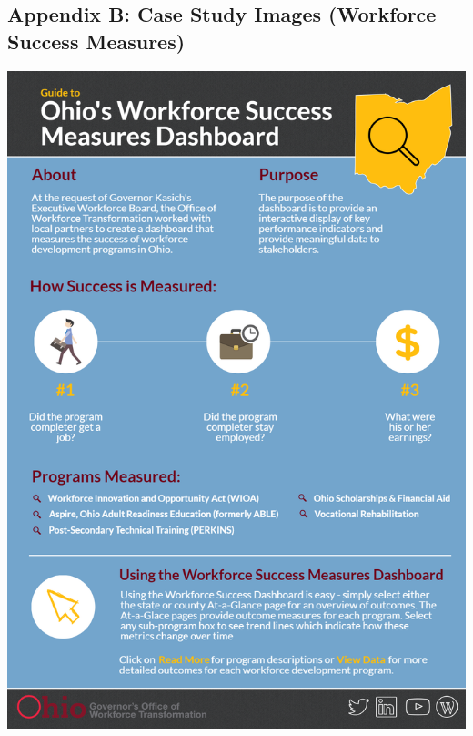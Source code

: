 

 \newpage
\hypertarget{appendix-b-case-study-images-workforce-success-measures}{%
\subsection*{Appendix B: Case Study Images (Workforce Success Measures)}\label{appendix-b-case-study-images-workforce-success-measures}}

\includegraphics[width=1\linewidth]{./figures/olda_appendixb}

